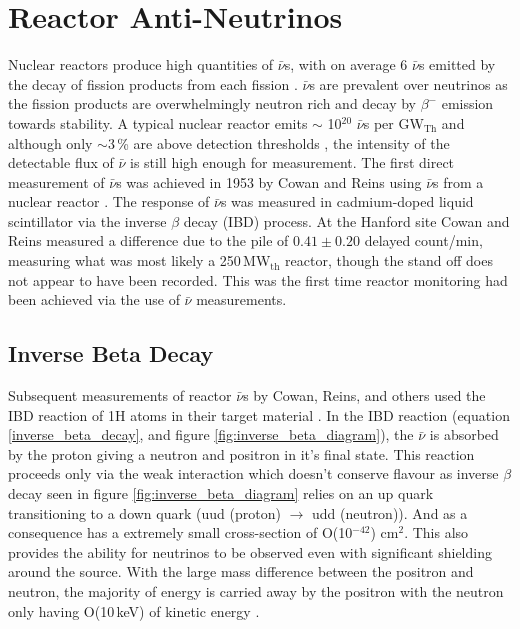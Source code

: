 \section{Reactor Anti-Neutrinos} \label{sec:reactorAntiNeutrinos}
Nuclear reactors produce high quantities of $\bar{\nu}$s, with on average 6 $\bar{\nu}$s emitted by the decay of fission products from each fission \cite{Mueller_2011}. $\bar{\nu}$s are prevalent over neutrinos as the fission products are overwhelmingly neutron rich and decay by $\beta^-$ emission towards stability. A typical nuclear reactor emits $\sim$ 10$^{20}$ $\bar{\nu}$s per GW$_{\textrm{Th}}$ \cite{Mueller_2011} and although only $\sim$3\,\% are above detection thresholds \cite{Mueller_2011}, the intensity of the detectable flux of $\bar{\nu}$ is still high enough for measurement. The first direct measurement of $\bar{\nu}$s was achieved in 1953 by Cowan and Reins using $\bar{\nu}$s from a nuclear reactor \cite{reines1953detection}. The response of $\bar{\nu}$s was measured in cadmium-doped liquid scintillator \cite{reines1953proposed} \cite{Cowan1956Confirmation} via the inverse $\beta$ decay (IBD) process. At the Hanford site Cowan and Reins measured a difference due to the pile of $0.41 \pm 0.20$ delayed count/min\cite{reines1953detection}, measuring what was most likely a 250\,MW$_{\textrm{th}}$ reactor, though the stand off does not appear to have been recorded. This was the first time reactor monitoring had been achieved via the use of $\bar{\nu}$ measurements. 

\subsection{Inverse Beta Decay} \label{subSec:IBD}
Subsequent measurements of reactor $\bar{\nu}$s by Cowan, Reins, and others used
the IBD reaction of 1H atoms in their target material \cite{Cowan1956Confirmation} \cite{sno2001} \cite{superK2001}. In the IBD reaction (equation \ref{inverse_beta_decay}, and figure \ref{fig:inverse_beta_diagram}), the $\bar{\nu}$ is absorbed by the proton giving a neutron and positron in  it's final state. This reaction proceeds only via the weak interaction which doesn't conserve flavour as inverse $\beta$ decay seen in figure \ref{fig:inverse_beta_diagram} relies on an up quark transitioning to a down quark (uud (proton) $\rightarrow$ udd (neutron)). And as a consequence has a extremely small cross-section of O(10$^{-42}$) cm$^2$\cite{Vogel_1999}. This also provides the ability for neutrinos to be observed even with significant shielding around the source. With the large mass difference between the positron and neutron, the majority of energy is carried away by the positron with the neutron only having O(10\,keV) of kinetic energy \cite{Vogel_1999}.

